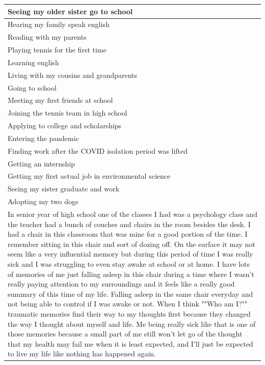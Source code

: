 \documentclass[
  .7em,
  letterpaper,
  DIV=11,
  numbers=noendperiod]{scrartcl}
\begin{document}
\begin{table}
\begin{tabular}{l}
\hline
Seeing my older sister go to school\\
\hline
Hearing my family speak english\\
\hline
Reading with my parents\\
\hline
Playing tennis for the first time\\
\hline
Learning english\\
\hline
Living with my cousins and grandparents\\
\hline
Going to school\\
\hline
Meeting my first friends at school\\
\hline
Joining the tennis team in high school\\
\hline
Applying to college and scholarships\\
\hline
Entering the pandemic\\
\hline
Finding work after the COVID isolation period was lifted\\
\hline
Getting an internship\\
\hline
Getting my first actual job in environmental science\\
\hline
Seeing my sister graduate and work\\
\hline
Adopting my two dogs\\
\hline
In senior year of high school one of the classes I had was a psychology class and the teacher had a bunch of couches and chairs in the room besides the desk. I had a chair in this classroom that was mine for a good portion of the time. I remember sitting in this chair and sort of dozing off. On the surface it may not seem like a very influential memory but during this period of time I was really sick and I was struggling to even stay awake at school or at home. I have lots of memories of me just falling asleep in this chair during a time where I wasn't really paying attention to my surroundings and it feels like a really good summary of this time of my life. Falling asleep in the same chair everyday and not being able to control if I was awake or not. When I think ""Who am I?"" traumatic memories find their way to my thoughts first because they changed the way I thought about myself and life. Me being really sick like that is one of those memories because a small part of me still won't let go of the thought that my health may fail me when it is least expected, and I'll just be expected to live my life like nothing has happened again.\\
\hline

\end{tabular}
\end{table}
\end{document}
